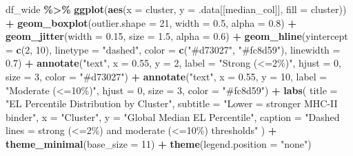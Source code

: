 \documentclass[
]{article}
\newenvironment{Shaded}{\begin{snugshade}}{\end{snugshade}}
\newcommand{\AttributeTok}[1]{\textcolor[rgb]{0.13,0.29,0.53}{#1}}
\newcommand{\DecValTok}[1]{\textcolor[rgb]{0.00,0.00,0.81}{#1}}
\newcommand{\FloatTok}[1]{\textcolor[rgb]{0.00,0.00,0.81}{#1}}
\newcommand{\FunctionTok}[1]{\textcolor[rgb]{0.13,0.29,0.53}{\textbf{#1}}}
\newcommand{\NormalTok}[1]{#1}
\newcommand{\SpecialCharTok}[1]{\textcolor[rgb]{0.81,0.36,0.00}{\textbf{#1}}}
\newcommand{\StringTok}[1]{\textcolor[rgb]{0.31,0.60,0.02}{#1}}
\begin{document}
\begin{Shaded}
\begin{Highlighting}[]
\NormalTok{df\_wide }\SpecialCharTok{\%\textgreater{}\%}
  \FunctionTok{ggplot}\NormalTok{(}\FunctionTok{aes}\NormalTok{(}\AttributeTok{x =}\NormalTok{ cluster, }\AttributeTok{y =}\NormalTok{ .data[[median\_col]], }\AttributeTok{fill =}\NormalTok{ cluster)) }\SpecialCharTok{+}
  \FunctionTok{geom\_boxplot}\NormalTok{(}\AttributeTok{outlier.shape =} \DecValTok{21}\NormalTok{, }\AttributeTok{width =} \FloatTok{0.5}\NormalTok{, }\AttributeTok{alpha =} \FloatTok{0.8}\NormalTok{) }\SpecialCharTok{+}
  \FunctionTok{geom\_jitter}\NormalTok{(}\AttributeTok{width =} \FloatTok{0.15}\NormalTok{, }\AttributeTok{size =} \FloatTok{1.5}\NormalTok{, }\AttributeTok{alpha =} \FloatTok{0.6}\NormalTok{) }\SpecialCharTok{+}
  \FunctionTok{geom\_hline}\NormalTok{(}\AttributeTok{yintercept =} \FunctionTok{c}\NormalTok{(}\DecValTok{2}\NormalTok{, }\DecValTok{10}\NormalTok{), }\AttributeTok{linetype =} \StringTok{"dashed"}\NormalTok{,}
             \AttributeTok{color =} \FunctionTok{c}\NormalTok{(}\StringTok{"\#d73027"}\NormalTok{, }\StringTok{"\#fc8d59"}\NormalTok{), }\AttributeTok{linewidth =} \FloatTok{0.7}\NormalTok{) }\SpecialCharTok{+}
  \FunctionTok{annotate}\NormalTok{(}\StringTok{"text"}\NormalTok{, }\AttributeTok{x =} \FloatTok{0.55}\NormalTok{, }\AttributeTok{y =} \DecValTok{2}\NormalTok{,}
           \AttributeTok{label =} \StringTok{"Strong (\textless{}=2\%)"}\NormalTok{,    }\AttributeTok{hjust =} \DecValTok{0}\NormalTok{, }\AttributeTok{size =} \DecValTok{3}\NormalTok{, }\AttributeTok{color =} \StringTok{"\#d73027"}\NormalTok{) }\SpecialCharTok{+}
  \FunctionTok{annotate}\NormalTok{(}\StringTok{"text"}\NormalTok{, }\AttributeTok{x =} \FloatTok{0.55}\NormalTok{, }\AttributeTok{y =} \DecValTok{10}\NormalTok{,}
           \AttributeTok{label =} \StringTok{"Moderate (\textless{}=10\%)"}\NormalTok{, }\AttributeTok{hjust =} \DecValTok{0}\NormalTok{, }\AttributeTok{size =} \DecValTok{3}\NormalTok{, }\AttributeTok{color =} \StringTok{"\#fc8d59"}\NormalTok{) }\SpecialCharTok{+}
  \FunctionTok{labs}\NormalTok{(}
    \AttributeTok{title    =} \StringTok{"EL Percentile Distribution by Cluster"}\NormalTok{,}
    \AttributeTok{subtitle =} \StringTok{"Lower = stronger MHC{-}II binder"}\NormalTok{,}
    \AttributeTok{x        =} \StringTok{"Cluster"}\NormalTok{,}
    \AttributeTok{y        =} \StringTok{"Global Median EL Percentile"}\NormalTok{,}
    \AttributeTok{caption  =} \StringTok{"Dashed lines = strong (\textless{}=2\%) and moderate (\textless{}=10\%) thresholds"}
\NormalTok{  ) }\SpecialCharTok{+}
  \FunctionTok{theme\_minimal}\NormalTok{(}\AttributeTok{base\_size =} \DecValTok{11}\NormalTok{) }\SpecialCharTok{+}
  \FunctionTok{theme}\NormalTok{(}\AttributeTok{legend.position =} \StringTok{"none"}\NormalTok{)}
\end{Highlighting}
\end{Shaded}
\end{document}
